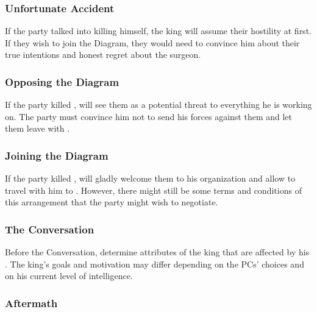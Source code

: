 \subsubsection{Unfortunate Accident}

If the party talked \npcDiagramSurgeon{} into killing himself, the king will assume their hostility at first. If they wish to join the Diagram, they would need to convince him about their true intentions and honest regret about the surgeon.

\subsubsection{Opposing the Diagram}

If the party killed \npcDiagramSurgeon{}, \npcTaravangian{} will see them as a potential threat to everything he is working on. The party must convince him not to send his forces against them and let them leave with \npcGhostbloodWounded{}.

\subsubsection{Joining the Diagram}

If the party killed \npcGhostbloodWounded{}, \npcTaravangian{} will gladly welcome them to his organization and allow to travel with him to \locationUrithiru{}. However, there might still be some terms and conditions of this arrangement that the party might wish to negotiate.

\subsubsection{The Conversation}

Before the Conversation, determine attributes of the king that are affected by his \abilityTaravangianBoonName{}. The king's goals and motivation may differ depending on the PCs' choices and on his current level of intelligence.



\subsubsection{Aftermath}

